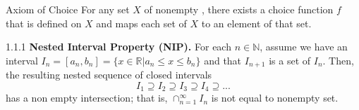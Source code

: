 \documentclass[11pt, a3paper, openany]{article}
\newcounter{Thm}[section]
\renewcommand{\theThm}{\arabic{section}.\arabic{Thm}}
\newenvironment{Thm}[1][]{
	\refstepcounter{Thm}
	\mdfsetup{
		frametitle={
			\tikz[baseline=(current bounding box.east), outer sep=0pt]
			\node[anchor=east,rectangle,fill=myblue]
			{\strut Theorem~\theThm\ifstrempty{#1}{}{:~#1}};},
		innertopmargin=10pt,linecolor=myblue,
		linewidth=2pt,topline=true,
		frametitleaboveskip=\dimexpr-\ht\strutbox\relax
	}
	\begin{mdframed}[]\relax
}{\end{mdframed}}
\theoremstyle{remark}
\theoremstyle{remark}
\theoremstyle{remark}
\newtheorem{claim}{\bfseries Claim}
\newenvironment{Proof of claim}
  {\begin{proof}[\normalfont \textbf{Proof of claim}]}
  {\end{proof}}
\begin{document}
\begin{Axiom}{Axiom of Choice}{}
    For any set $X$ of nonempty , there exists a choice function $f$ that is defined on $X$ and maps each set of $X$ to an element of that set.
\end{Axiom}
\begin{theorem}{1.1.1}{}
\textbf{Nested Interval Property (NIP).} For each $n\in \mathbb{N}$, assume we have an interval $I_{n}=[a_{n}, b_{n}]=\{x \in \mathbb{R}|a_{n} \leq x \leq b_{n}\}$ and that $I_{n+1}$ is a set of $I_{n}$. Then, the resulting nested sequence of closed intervals
\begin{equation*}
    I_1 \supseteq I_2 \supseteq I_3 \supseteq I_4 \supseteq ...
\end{equation*}
has a non empty intersection; that is, $\cap_{n=1}^{\infty} I_{n}$ is not equal to nonempty set.

\end{theorem}
\end{document}
